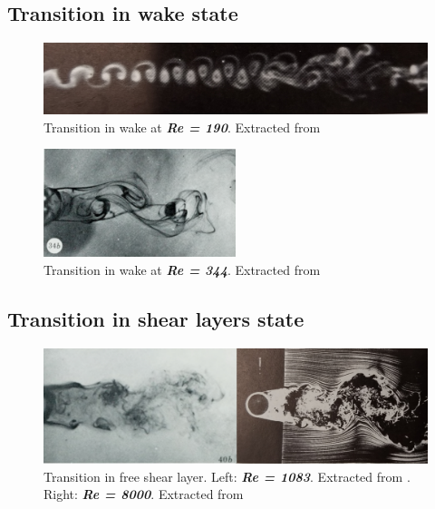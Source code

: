 \documentclass[journal]{new-aiaa}
\begin{document}
\subsection{Transition in wake state}

\begin{figure}[H]
\begin{center}
\includegraphics[width=1\textwidth]{Images/federico/Figure03}
\caption{Transition in wake at \textbf{\textit{Re = 190}}. Extracted from \cite{Zdravkovich1968} }
\label{fig:TrW1}
\end{center}
\end{figure}

\begin{figure}[H]
\begin{center}
\includegraphics[width=0.5\textwidth]{Images/federico/Figure04}
\caption{Transition in wake at \textbf{\textit{Re = 344}}. Extracted from \cite{Gerrard1978} }
\label{fig:TrW2}
\end{center}
\end{figure}

\subsection{Transition in shear layers state}

\begin{figure}[H]
\begin{center}
\includegraphics[width=1\textwidth]{Images/federico/Figure05}
\caption{Transition in free shear layer. Left: \textbf{\textit{Re = 1083}}. Extracted from \cite{Gerrard1978}. Right: \textbf{\textit{Re = 8000}}. Extracted from \cite{Zdravkovich1997}}
\label{fig:TrSL}
\end{center}
\end{figure}
\end{document}
